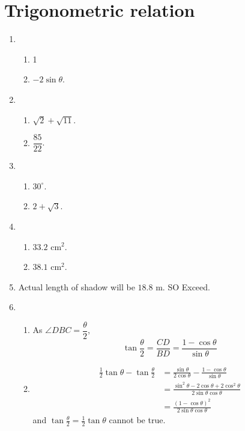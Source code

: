 \documentclass[12pt]{article}
\begin{document}
    \section{Trigonometric relation}
    \begin{enumerate}
        \item \begin{enumerate}
            \item 1
            \item $-2\sin{\theta}$.
        \end{enumerate}
        \item \begin{enumerate}
            \item $\sqrt{2}+\sqrt{11}$.
            \item $\dfrac{85}{22}$.
        \end{enumerate}
        \item \begin{enumerate}
            \item $30^\circ$.
            \item $2+\sqrt{3}$.
        \end{enumerate}
        \item \begin{enumerate}
            \item $33.2$ cm$^2$.
            \item $38.1$ cm$^2$.
        \end{enumerate}
        \item Actual length of shadow will be $18.8$ m. SO Exceed.
        \item \begin{enumerate}
            \item As $\angle DBC = \dfrac{\theta}{2}$, \[\tan{\frac{\theta}{2}}=\frac{CD}{BD}=\frac{1-\cos{\theta}}{\sin{\theta}}\]
            \item \begin{align*}
                \frac{1}{2}\tan{\theta}-\tan{\frac{\theta}{2}}&=\frac{\sin{\theta}}{2\cos{\theta}}-\frac{1-\cos{\theta}}{\sin{\theta}}\\
                &=\frac{\sin^2{\theta}-2\cos{\theta}+2\cos^2{\theta}}{2\sin{\theta}\cos{\theta}}\\
                &=\frac{(1-\cos{\theta})^2}{2\sin{\theta}\cos{\theta}}
            \end{align*} and $\tan{\frac{\theta}{2}}=\frac{1}{2}\tan{\theta}$ cannot be true.
        \end{enumerate}
    \end{enumerate}
\end{document}
